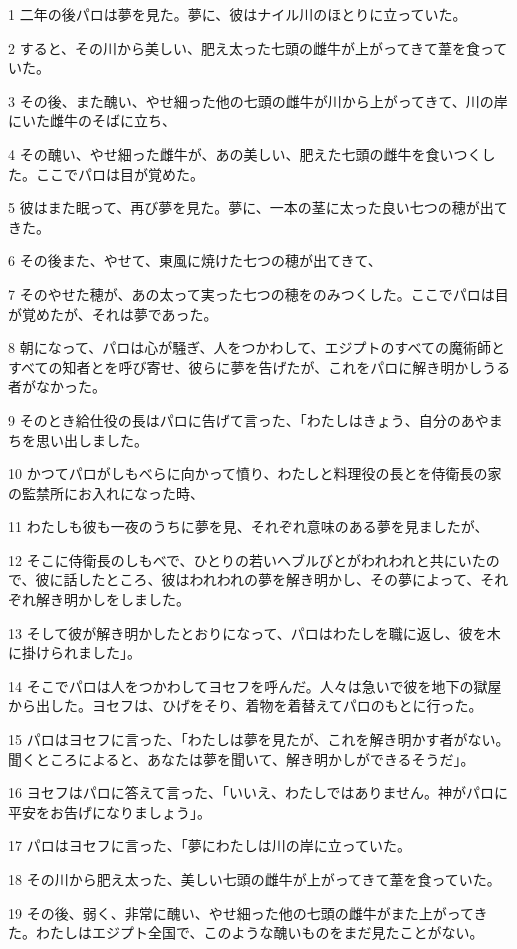 \par 1 二年の後パロは夢を見た。夢に、彼はナイル川のほとりに立っていた。
\par 2 すると、その川から美しい、肥え太った七頭の雌牛が上がってきて葦を食っていた。
\par 3 その後、また醜い、やせ細った他の七頭の雌牛が川から上がってきて、川の岸にいた雌牛のそばに立ち、
\par 4 その醜い、やせ細った雌牛が、あの美しい、肥えた七頭の雌牛を食いつくした。ここでパロは目が覚めた。
\par 5 彼はまた眠って、再び夢を見た。夢に、一本の茎に太った良い七つの穂が出てきた。
\par 6 その後また、やせて、東風に焼けた七つの穂が出てきて、
\par 7 そのやせた穂が、あの太って実った七つの穂をのみつくした。ここでパロは目が覚めたが、それは夢であった。
\par 8 朝になって、パロは心が騒ぎ、人をつかわして、エジプトのすべての魔術師とすべての知者とを呼び寄せ、彼らに夢を告げたが、これをパロに解き明かしうる者がなかった。
\par 9 そのとき給仕役の長はパロに告げて言った、「わたしはきょう、自分のあやまちを思い出しました。
\par 10 かつてパロがしもべらに向かって憤り、わたしと料理役の長とを侍衛長の家の監禁所にお入れになった時、
\par 11 わたしも彼も一夜のうちに夢を見、それぞれ意味のある夢を見ましたが、
\par 12 そこに侍衛長のしもべで、ひとりの若いヘブルびとがわれわれと共にいたので、彼に話したところ、彼はわれわれの夢を解き明かし、その夢によって、それぞれ解き明かしをしました。
\par 13 そして彼が解き明かしたとおりになって、パロはわたしを職に返し、彼を木に掛けられました」。
\par 14 そこでパロは人をつかわしてヨセフを呼んだ。人々は急いで彼を地下の獄屋から出した。ヨセフは、ひげをそり、着物を着替えてパロのもとに行った。
\par 15 パロはヨセフに言った、「わたしは夢を見たが、これを解き明かす者がない。聞くところによると、あなたは夢を聞いて、解き明かしができるそうだ」。
\par 16 ヨセフはパロに答えて言った、「いいえ、わたしではありません。神がパロに平安をお告げになりましょう」。
\par 17 パロはヨセフに言った、「夢にわたしは川の岸に立っていた。
\par 18 その川から肥え太った、美しい七頭の雌牛が上がってきて葦を食っていた。
\par 19 その後、弱く、非常に醜い、やせ細った他の七頭の雌牛がまた上がってきた。わたしはエジプト全国で、このような醜いものをまだ見たことがない。

